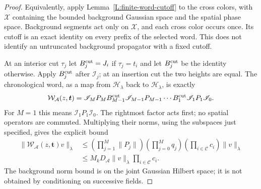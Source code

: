 \documentclass[12pt]{article}
\numberwithin{equation}{section}
\theoremstyle{definition}
\begin{document}
\begin{proof}
  Equivalently, apply Lemma~\ref{L:finite-word-cutoff} to the cross
  colors, with $\mathscr X$ containing the bounded background Gaussian
  space and the spatial phase space. Background segments act only on
  $\mathscr X$, and each cross color occurs once. Its cutoff is an
  exact identity on every prefix of the selected word. This does not
  identify an untruncated background propagator with a fixed cutoff.

  At an interior cut $\tau_j$ let $B_j^{\rm cut}=J_i$ if
  $\tau_j=t_i$ and let $B_j^{\rm cut}$ be the identity otherwise.
  Apply $B_j^{\rm cut}$ after $\mathscr I_j$; at an insertion cut the
  two heights are equal. The chronological word, as a map from
  $\mathcal H_\lambda$ back to $\mathcal H_\lambda$, is exactly
  \[
    \mathcal W_{\mathcal A}(z,\boldsymbol t)
    =\mathscr I_M P_M B_{M-1}^{\rm cut}\mathscr I_{M-1}P_{M-1}
    \cdots B_1^{\rm cut}\mathscr I_1P_1\mathscr I_0.
  \]
  For $M=1$ this means $\mathscr I_1P_1\mathscr I_0$.
  The rightmost factor acts first; no spatial operators are commuted.
  Multiplying their norms, using the subspaces just specified,
  gives the explicit bound
  \begin{equation}\label{E:split-word-product}
    \begin{split}
      \|\mathcal W_{\mathcal A}(z,\boldsymbol t)v\|_\lambda
      &\le\left(\prod_{j=1}^M\|P_j\|\right)
      \left(\prod_{j=0}^M q_j\right)
      \left(\prod_{i\in\mathcal C}c_i\right)\|v\|_\lambda\\
      &\le M_kD_{\mathcal A}\|v\|_\lambda
      \prod_{i\in\mathcal C}c_i.
    \end{split}
  \end{equation}
  The background norm bound is on the joint Gaussian Hilbert space;
  it is not obtained by conditioning on successive fields.


\end{proof}
\end{document}
